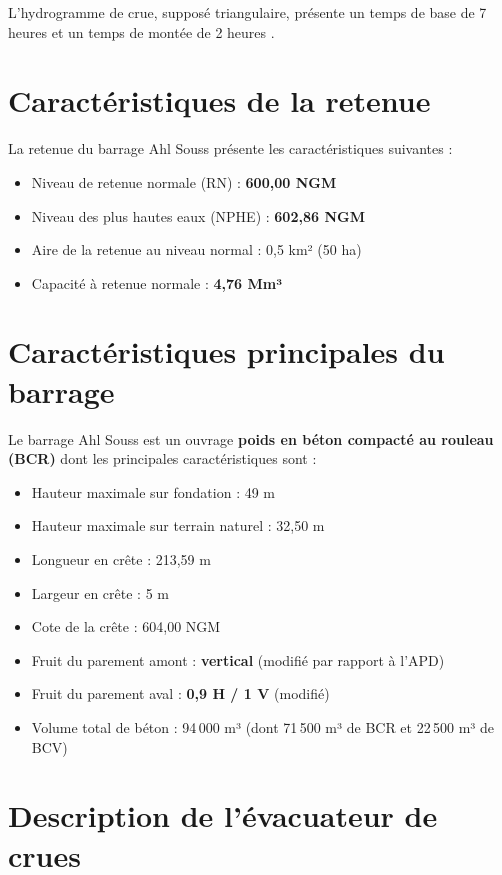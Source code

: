 L'hydrogramme de crue, supposé triangulaire, présente un temps de base de 7 heures et un temps de montée de 2 heures \cite{donnees_hydrologiques}.

\section{Caractéristiques de la retenue}
\label{sec:retenue}

La retenue du barrage Ahl Souss présente les caractéristiques suivantes \cite{fiche_synoptique, bilans_apports} :
\begin{itemize}
    \item Niveau de retenue normale (RN) : \textbf{600,00 NGM}
    \item Niveau des plus hautes eaux (NPHE) : \textbf{602,86 NGM}
    \item Aire de la retenue au niveau normal : 0,5 km² (50 ha)
    \item Capacité à retenue normale : \textbf{4,76 Mm³}
\end{itemize}

\section{Caractéristiques principales du barrage}
\label{sec:caracteristiques_barrage}

Le barrage Ahl Souss est un ouvrage \textbf{poids en béton compacté au rouleau (BCR)} dont les principales caractéristiques sont \cite{fiche_synoptique, fiche_historique} :
\begin{itemize}
    \item Hauteur maximale sur fondation : 49 m
    \item Hauteur maximale sur terrain naturel : 32,50 m
    \item Longueur en crête : 213,59 m
    \item Largeur en crête : 5 m
    \item Cote de la crête : 604,00 NGM
    \item Fruit du parement amont : \textbf{vertical} (modifié par rapport à l'APD)
    \item Fruit du parement aval : \textbf{0,9 H / 1 V} (modifié)
    \item Volume total de béton : 94\,000 m³ (dont 71\,500 m³ de BCR et 22\,500 m³ de BCV)
\end{itemize}

\section{Description de l'évacuateur de crues}
\label{sec:evacuateur_crues}

